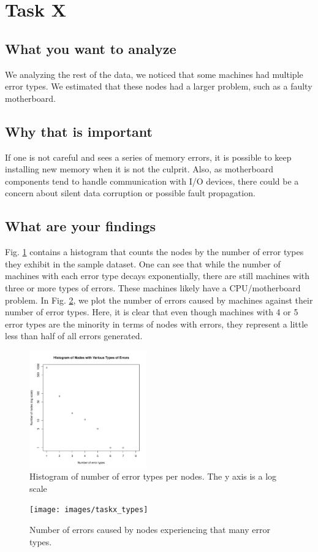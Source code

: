 \section{Task X}
\subsection{What you want to analyze}
We analyzing the rest of the data, we noticed that some machines had multiple
error types.  We estimated that these nodes had a larger problem, such as a
faulty motherboard.

\subsection{Why that is important}
If one is not careful and sees a series of memory errors, it is possible to keep
installing new memory when it is not the culprit.  Also, as motherboard
components tend to handle communication with I/O devices, there could be a
concern about silent data corruption or possible fault propagation. 

\subsection{What are your findings}
Fig. \ref{fig:taskx} contains a histogram that counts the nodes by 
the number of error types they exhibit in the sample dataset.  One can see that
while the number of machines with each error type decays exponentially, there
are still machines with three or more types of errors.  These machines likely
have a CPU/motherboard problem.  In Fig. \ref{fig:taskx_types}, we plot the
number of errors caused by machines against their number of error types.  Here,
it is clear that even though machines with 4 or 5 error types are the minority
in terms of nodes with errors, they represent a little less than half of all
errors generated.
\begin{figure}[h]
  \centering
  \includegraphics[width=0.45\textwidth]{images/taskx}
  \caption{Histogram of number of error types per nodes. The y axis is a log
  scale}\label{fig:taskx}
\end{figure}
\begin{figure}[h]
  \centering
  \texttt{[image: images/taskx\_types]}
  \caption{Number of errors caused by nodes experiencing that many error types.
  }\label{fig:taskx_types}
\end{figure}
